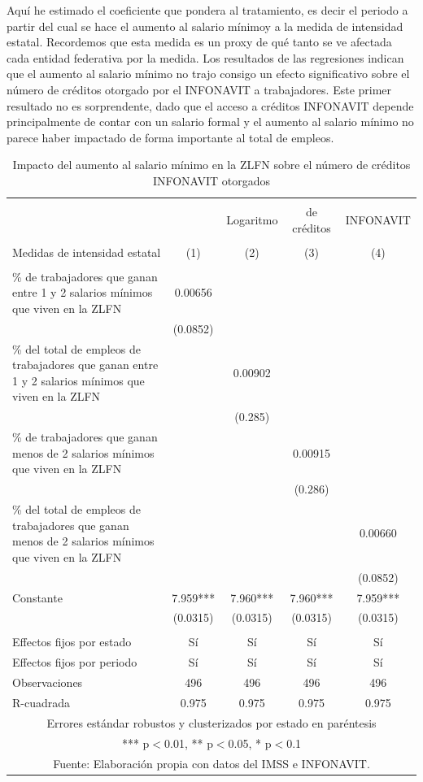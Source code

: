 Aquí he estimado el coeficiente  que pondera al tratamiento, es decir el periodo a partir del cual se hace el aumento al salario mínimoy a la medida de intensidad estatal. Recordemos que esta medida es un proxy de qué tanto se ve afectada cada entidad federativa por la medida. Los resultados de las regresiones indican que el aumento al salario mínimo no trajo consigo un efecto significativo sobre el número de créditos otorgado por el INFONAVIT a trabajadores. Este primer resultado no es sorprendente, dado que el acceso a créditos INFONAVIT depende principalmente de contar con un salario formal y el aumento al salario mínimo no parece haber impactado de forma importante al total de empleos.

\begin{table}[H]
\caption{Impacto del aumento al salario mínimo en la ZLFN sobre el número de créditos INFONAVIT otorgados}
\label{tab:2}
\begin{adjustbox}{max width=\textwidth}
\begin{tabular}{lcccc}

\hline \\
 & & Logaritmo & de créditos & INFONAVIT  \\
 &  &  &  &  \\
Medidas de intensidad estatal & (1) & (2) & (3) & (4)  \\ \hline
 &  &  &  &  \\
\% de trabajadores que ganan entre 1 y 2 salarios mínimos que viven en la ZLFN & 0.00656 &  &  &  \\
 & (0.0852) &  &  &  \\
\% del total de empleos de trabajadores que ganan entre 1 y 2 salarios mínimos que viven en la ZLFN &  & 0.00902 &  &  \\
 &  & (0.285) &  &  \\
\% de trabajadores que ganan menos de 2 salarios mínimos que viven en la ZLFN &  &  & 0.00915 &  \\
 &  &  & (0.286) &  \\
\% del total de empleos de trabajadores que ganan menos de 2 salarios mínimos que viven en la ZLFN  &  &  &  & 0.00660 \\
 &  &  &  & (0.0852) \\
Constante & 7.959*** & 7.960*** & 7.960*** & 7.959*** \\
 & (0.0315) & (0.0315) & (0.0315) & (0.0315) \\
 &  &  &  &  \\
 Effectos fijos por estado  &  Sí &  Sí &  Sí & Sí \\
  Effectos fijos por periodo  &  Sí &  Sí &  Sí & Sí \\
Observaciones & 496 & 496 & 496 & 496 \\
 R-cuadrada & 0.975 & 0.975 & 0.975 & 0.975 \\ \hline
\multicolumn{5}{c}{ Errores estándar robustos y clusterizados por estado en paréntesis} \\
\multicolumn{5}{c}{ *** p$<$0.01, ** p$<$0.05, * p$<$0.1} \\
\multicolumn{5}{c}{Fuente: Elaboración propia con datos del IMSS e INFONAVIT.} \\


\end{tabular}
\end{adjustbox}
\end{table}
